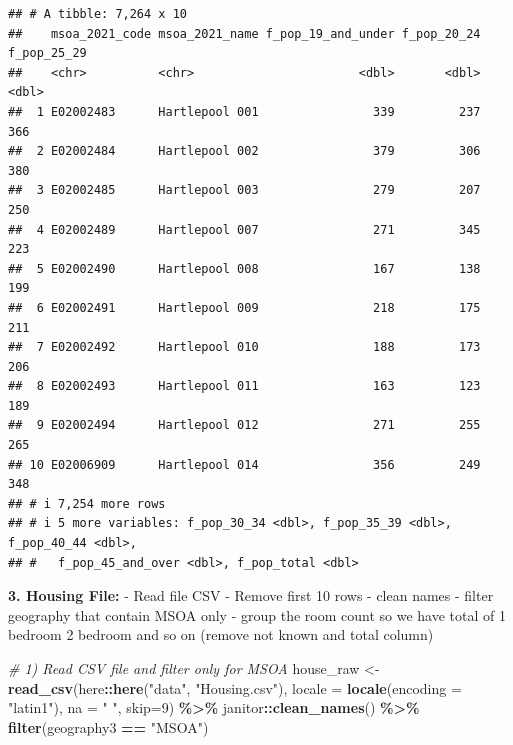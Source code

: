 \documentclass[
]{article}
\newenvironment{Shaded}{\begin{snugshade}}{\end{snugshade}}
\newcommand{\AttributeTok}[1]{\textcolor[rgb]{0.13,0.29,0.53}{#1}}
\newcommand{\CommentTok}[1]{\textcolor[rgb]{0.56,0.35,0.01}{\textit{#1}}}
\newcommand{\DecValTok}[1]{\textcolor[rgb]{0.00,0.00,0.81}{#1}}
\newcommand{\FunctionTok}[1]{\textcolor[rgb]{0.13,0.29,0.53}{\textbf{#1}}}
\newcommand{\NormalTok}[1]{#1}
\newcommand{\OtherTok}[1]{\textcolor[rgb]{0.56,0.35,0.01}{#1}}
\newcommand{\SpecialCharTok}[1]{\textcolor[rgb]{0.81,0.36,0.00}{\textbf{#1}}}
\newcommand{\StringTok}[1]{\textcolor[rgb]{0.31,0.60,0.02}{#1}}
\begin{document}
\begin{verbatim}
## # A tibble: 7,264 x 10
##    msoa_2021_code msoa_2021_name f_pop_19_and_under f_pop_20_24 f_pop_25_29
##    <chr>          <chr>                       <dbl>       <dbl>       <dbl>
##  1 E02002483      Hartlepool 001                339         237         366
##  2 E02002484      Hartlepool 002                379         306         380
##  3 E02002485      Hartlepool 003                279         207         250
##  4 E02002489      Hartlepool 007                271         345         223
##  5 E02002490      Hartlepool 008                167         138         199
##  6 E02002491      Hartlepool 009                218         175         211
##  7 E02002492      Hartlepool 010                188         173         206
##  8 E02002493      Hartlepool 011                163         123         189
##  9 E02002494      Hartlepool 012                271         255         265
## 10 E02006909      Hartlepool 014                356         249         348
## # i 7,254 more rows
## # i 5 more variables: f_pop_30_34 <dbl>, f_pop_35_39 <dbl>, f_pop_40_44 <dbl>,
## #   f_pop_45_and_over <dbl>, f_pop_total <dbl>
\end{verbatim}

\textbf{3. Housing File:} - Read file CSV - Remove first 10 rows - clean
names - filter geography that contain MSOA only - group the room count
so we have total of 1 bedroom 2 bedroom and so on (remove not known and
total column)

\begin{Shaded}
\begin{Highlighting}[]
\CommentTok{\# 1) Read CSV file and filter only for MSOA}
\NormalTok{house\_raw }\OtherTok{\textless{}{-}} \FunctionTok{read\_csv}\NormalTok{(here}\SpecialCharTok{::}\FunctionTok{here}\NormalTok{(}\StringTok{"data"}\NormalTok{, }\StringTok{"Housing.csv"}\NormalTok{),}
                       \AttributeTok{locale =} \FunctionTok{locale}\NormalTok{(}\AttributeTok{encoding =} \StringTok{"latin1"}\NormalTok{),}
                       \AttributeTok{na =} \StringTok{" "}\NormalTok{, }\AttributeTok{skip=}\DecValTok{9}\NormalTok{) }\SpecialCharTok{\%\textgreater{}\%}
\NormalTok{  janitor}\SpecialCharTok{::}\FunctionTok{clean\_names}\NormalTok{() }\SpecialCharTok{\%\textgreater{}\%} 
  \FunctionTok{filter}\NormalTok{(geography3 }\SpecialCharTok{==} \StringTok{"MSOA"}\NormalTok{)}
\end{Highlighting}
\end{Shaded}
\end{document}
